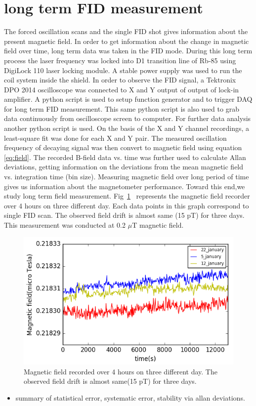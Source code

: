   \section{long term FID measurement}  
The forced oscillation scans and the single FID shot gives information about the present magnetic field. In order to get information about the change in magnetic field over time, long term data was taken in the FID mode. During this long term process the laser frequency was locked into D1 transition line of Rb-85 using DigiLock 110 laser locking module. A stable power supply was used to run the coil system inside the shield. In order to observe the FID signal, a Tektronix DPO 2014 oscilloscope was connected to X and Y output of output of lock-in amplifier. A python script is used to setup function generator and to trigger DAQ for long term FID measurement. This same python script is also used to grab data continuously from oscilloscope screen to computer. For further data analysis  another python script is used. On the basis of the X
and Y channel recordings, a least-square fit was done for each X and Y pair. The measured oscillation frequency of decaying signal was then convert to magnetic field using equation \ref{eq:field}. The recorded B-field data vs. time was further used to calculate Allan deviations, getting  information on the deviations from the mean magnetic field vs. integration time (bin size). Measuring magnetic field over long period of time gives us information about the magnetometer performance. Toward this end,we study long term field measurement. Fig~\ref{fig:long term field} ~represents the magnetic field recorder over 4 hours on three different day. Each data points in this graph correspond to single FID scan. The observed field drift is almost same (15 pT) for three days. This measurement was conducted at 0.2 $\mu$T magnetic field.
\begin{figure}[h]
\centering\includegraphics[width=0.85\linewidth]{figures/field_3_day}
\caption{Magnetic field recorded over 4 hours on three different day. The observed field drift is almost same(15 pT) for three days.\label{fig:long term field}}
\end{figure}
   \begin{itemize}
   \item summary of statistical error, systematic error, stability via allan deviations.
   \end{itemize}
  
